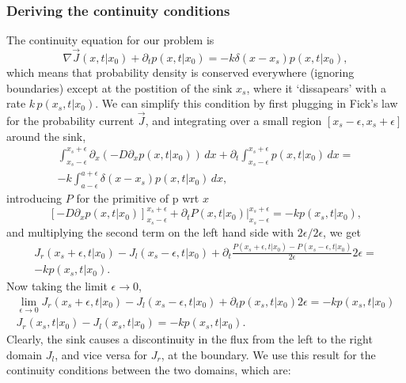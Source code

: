 \subsubsection{Deriving the continuity conditions}

The continuity equation for our problem is
\begin{equation}
 \nabla \vec{J}(x,t|x_0) + \partial_t p(x,t|x_0) = -k \delta( x - x_s ) p(x,t|x_0),
\end{equation}
which means that probability density is conserved everywhere (ignoring boundaries) except at the postition of the sink $x_s$, where it `dissapears' with a rate $k\,p(x_s,t|x_0)$. We can simplify this condition by first plugging in Fick's law for the probability current $\vec{J}$, and integrating over a small region $[x_s - \epsilon,x_s + \epsilon]$ around the sink, 
\setlength{\jot}{10pt}
\begin{gather}
\int_{x_s - \epsilon}^{x_s + \epsilon} \partial_x \left( -D \partial_x p(x,t|x_0)  \right) \, dx + \partial_t \int_{x_s - \epsilon}^{x_s + \epsilon} p(x,t|x_0) \, dx = \nonumber \\
-k \int_{a - \epsilon}^{a + \epsilon} \delta( x - x_s ) p(x,t|x_0) \, dx, \nonumber
\end{gather}
introducing $P$ for the primitive of p wrt $x$
\begin{equation}
\left[ -D \partial_x p(x,t|x_0)  \right]_{x_s - \epsilon}^{x_s + \epsilon} + \partial_t \left. P(x,t|x_0) \right|_{x_s - \epsilon}^{x_s + \epsilon} = -k p(x_s,t|x_0) \nonumber,
\end{equation}
and multiplying the second term on the left hand side with $2\epsilon/2\epsilon$, we get
\begin{gather}
J_r(x_s + \epsilon,t|x_0) - J_l(x_s - \epsilon,t|x_0) + \partial_t \frac{P(x_s + \epsilon,t|x_0) - P(x_s - \epsilon,t|x_0)}{2 \epsilon} 2\epsilon = \nonumber \\ 
-k p(x_s,t|x_0). \nonumber
\end{gather}
Now taking the limit $\epsilon \rightarrow 0$,
\begin{gather}
 \lim_{\epsilon \to 0} J_r(x_s + \epsilon,t|x_0) - J_l(x_s - \epsilon,t|x_0) + \partial_t p(x_s,t|x_0) 2\epsilon = -k p(x_s,t|x_0) \nonumber \\
 J_r(x_s,t|x_0) - J_l(x_s,t|x_0) = -k p(x_s,t|x_0).
\end{gather}
Clearly, the sink causes a discontinuity in the flux from the left to the right domain $J_l$, and vice versa for $J_r$, at the boundary. We use this result for the continuity conditions between the two domains, which are:


